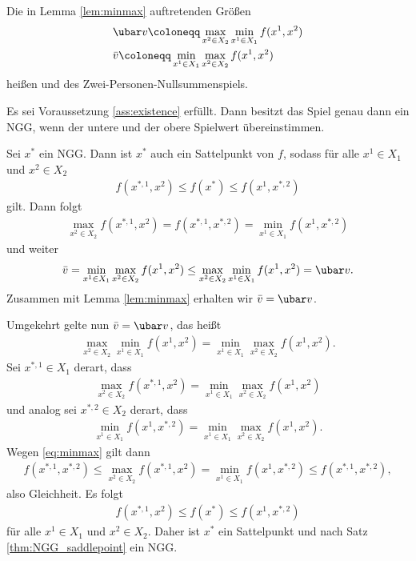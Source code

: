 \begin{bemerkung*}
  Die in Lemma \ref{lem:minmax} auftretenden Größen
  \begin{align*}
    &\ubar v \coloneqq \max_{x^{2} \in X_{2}}\min_{x^{1} \in X_{1}} f(x^{1}, x^{2})\\
    &\bar v \coloneqq \min_{x^{1} \in X_{1}}\max_{x^{2} \in X_{2}} f(x^{1}, x^{2})
  \end{align*}
heißen  und  des Zwei-Personen-Nullsummenspiels.
\end{bemerkung*}
\begin{satz}
  Es sei Voraussetzung \ref{ass:existence} erfüllt. Dann besitzt das Spiel genau dann ein NGG, wenn der untere und der obere Spielwert übereinstimmen. 
\end{satz}
\begin{beweis}
  Sei $x^{*}$ ein NGG. Dann ist $x^{*}$ auch ein Sattelpunkt von $f$, sodass für alle $x^{1} \in X_{1}$ und $x^{2} \in X_{2}$ 
  \begin{align*}
    f(x^{*, 1}, x^{2}) \leq f(x^{*})\leq f(x^{1}, x^{*, 2})
  \end{align*}
gilt. Dann folgt
\begin{align*}
    \max_{x^{2} \in X_{2}} f(x^{*, 1}, x^{2})  = f(x^{*,1}, x^{*, 2}) = \min_{x^{1} \in X_{1}} f(x^{1}, x^{*,2})
\end{align*}
und weiter
\begin{align*}
  \bar v = \min_{x^{1} \in X_{1}}\max_{x^{2} \in X_{2}} f(x^{1}, x^{2}) \leq  \max_{x^{2} \in X_{2}}  \min_{x^{1} \in X_{1}}f(x^{1}, x^{2}) = \ubar v.
\end{align*}
Zusammen mit Lemma \ref{lem:minmax} erhalten wir $\bar v = \ubar v$.
\vspace{5mm}

Umgekehrt gelte nun $\bar v = \ubar v$, das heißt
\begin{align}\label{eq:minmax}
  \max_{x^{2} \in X_{2}} \min_{x^{1} \in X_{1}}f(x^{1}, x^{2}) = \min_{x^{1} \in X_{1}} \max_{x^{2} \in X_{2}}f(x^{1}, x^{2}).
\end{align}
Sei $x^{*,1} \in X_{1}$ derart, dass 
\begin{align*}
\max_{x^{2} \in X_{2}}f(x^{*,1}, x^{2}) = \min_{x^{1} \in X_{1}} \max_{x^{2} \in X_{2}}f(x^{1}, x^{2})
\end{align*}
 und analog sei $x^{*,2} \in X_{2}$ derart, dass 
 \begin{align*}
   \min_{x^{1} \in X_{1}}f(x^{1}, x^{*,2}) = \min_{x^{1} \in X_{1}} \max_{x^{2} \in X_{2}}f(x^{1}, x^{2}).
 \end{align*}
Wegen \eqref{eq:minmax} gilt dann
\begin{align*}
f(x^{*, 1}, x^{*, 2})\leq \max_{x^{2} \in X_{2}}f(x^{*,1}, x^{2}) = \min_{x^{1} \in X_{1}}f(x^{1}, x^{*,2})\leq f(x^{*, 1}, x^{*, 2}), 
\end{align*}
also Gleichheit. Es folgt 
\begin{align*}
  f(x^{*, 1}, x^{2}) \leq f(x^{*}) \leq f(x^{1}, x^{*, 2})  
\end{align*}
für alle $x^{1} \in X_{1} $ und $x^{2} \in X_{2}$. Daher ist $x^{*}$ ein Sattelpunkt und nach Satz \ref{thm:NGG_saddlepoint} ein NGG.
\end{beweis}
